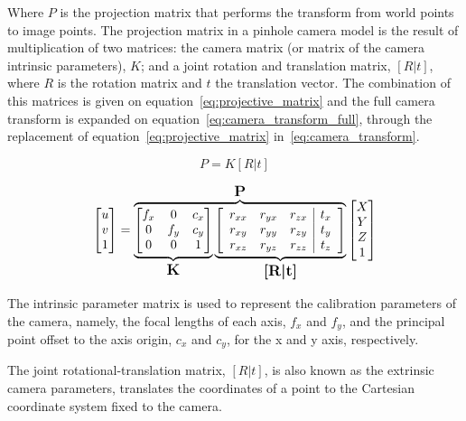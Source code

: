Where $P$ is the projection matrix that performs the transform from world points to image points. The projection matrix in a pinhole camera model is the result of multiplication of two matrices: the camera matrix (or matrix of the camera intrinsic parameters), $K$; and a joint rotation and translation matrix, $[R|t]$, where $R$ is the rotation matrix and $t$ the translation vector. The combination of this matrices is given on equation~\ref{eq:projective_matrix} and the full camera transform is expanded on equation~\ref{eq:camera_transform_full}, through the replacement of equation~\ref{eq:projective_matrix} in~\ref{eq:camera_transform}.

\begin{equation}
	\label{eq:projective_matrix}
	P = K[R|t]
\end{equation}

\begin{equation}
	\label{eq:camera_transform_full}
	\begin{bmatrix}
		u \\
		v \\
		1
	\end{bmatrix}
	= 
	\overbrace{
		\underbrace{
			\begin{bmatrix}
				f_x & 0 & c_x \\
				0 & f_y & c_y \\
				0 & 0 & 1 
			\end{bmatrix}
		}_\text{\large\textbf{K}}
		\underbrace{
			\left[
				\begin{array}{ccc|c}
					r_{xx} & r_{yx} & r_{zx} & t_x \\
					r_{xy} & r_{yy} & r_{zy} & t_y \\
					r_{xz} & r_{yz} & r_{zz} & t_z 
				\end{array}
		\right]
		}_\text{\large\textbf{[R|t]}}
	}^\text{\large\textbf{P}}
	\begin{bmatrix}
		X \\
		Y \\
		Z \\
		1
	\end{bmatrix}
\end{equation}

The intrinsic parameter matrix is used to represent the calibration parameters of the camera, namely, the focal lengths of each axis, $f_x$ and $f_y$, and the principal point offset to the axis origin, $c_x$ and $c_y$, for the x and y axis, respectively. 

The joint rotational-translation matrix, $[R|t]$, is also known as the extrinsic camera parameters, translates the coordinates of a point to the Cartesian coordinate system fixed to the camera.
	
